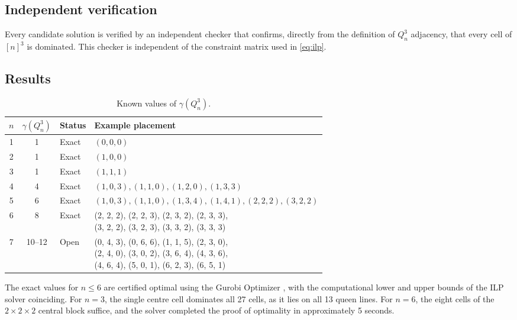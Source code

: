 \documentclass[11pt]{article}
\begin{document}
\subsection{Independent verification}

Every candidate solution is verified by an independent checker that confirms,
directly from the definition of $Q^3_n$ adjacency, that every cell of $[n]^3$
is dominated. This checker is independent of the constraint matrix used in
\eqref{eq:ilp}.

\subsection*{Results}

\begin{table}[ht]
\centering
\caption{Known values of $\gamma(Q^3_n)$.}
\label{tab:values}
\begin{tabular}{ccll}
\toprule
$n$ & $\gamma(Q^3_n)$ & Status & Example placement \\
\midrule
1 & 1 & Exact & $(0,0,0)$ \\
\midrule
2 & 1 & Exact & $(1,0,0)$ \\
\midrule
3 & 1 & Exact & $(1,1,1)$ \\
\midrule
4 & 4 & Exact & $(1,0,3),(1,1,0),(1,2,0),(1,3,3)$ \\
\midrule
5 & 6 & Exact & $(1,0,3),(1,1,0),(1,3,4),(1,4,1),(2,2,2),(3,2,2)$ \\
\midrule
6 & 8 & Exact & \makecell[l]{(2, 2, 2), (2, 2, 3), (2, 3, 2), (2, 3, 3), \\ (3, 2, 2), (3, 2, 3), (3, 3, 2), (3, 3, 3)} \\
\midrule
7 & 10--12 & Open & \makecell[l]{(0, 4, 3), (0, 6, 6), (1, 1, 5), (2, 3, 0), \\ (2, 4, 0), (3, 0, 2), (3, 6, 4), (4, 3, 6), \\ (4, 6, 4), (5, 0, 1), (6, 2, 3), (6, 5, 1)} \\
\bottomrule
\end{tabular}
\end{table}
\noindent The exact values for $n \leq 6$ are certified optimal using the Gurobi Optimizer \cite{gurobi}, with the computational lower and upper bounds of the ILP solver coinciding. For $n = 3$, the single centre cell dominates all 27 cells, as it lies on all 13 queen lines. For $n = 6$, the eight cells of the $2\times2\times2$ central block suffice, and the solver completed the proof of optimality in approximately 5 seconds. 
\end{document}
